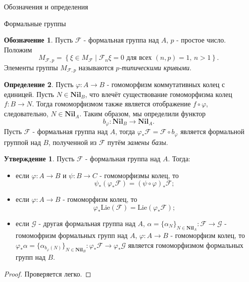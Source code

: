 \documentclass[a4paper,14pt]{extarticle}
\theoremstyle{definition}
\newtheorem{definition}{Определение}[section]
\newtheorem{denotation}[definition]{Обозначение}
\newtheorem{claim}[theorem]{Утверждение}
\newcommand{\Lie}[1]{\mathrm{Lie}\left(#1\right)}
\newcommand{\Nil}[1]{\mathbf{Nil}_{#1}}
\newcommand{\eF}{\mathcal{F}}
\newcommand{\sF}{\mathscr{F}}
\newcommand{\sG}{\mathscr{G}}
\begin{document}
\begin{section}{Обозначения и определения}
\begin{subsection}{Формальные группы}
\begin{denotation}\label{denote:3.8:p-typical_curves_group}
    Пусть $\sF$ - формальная группа над $A$, $p$ - простое число. Положим
    \begin{equation*}
        M_{\sF, p} = \left\{
            \xi \in M_\sF
        \middle|
            \text{${ \eF_n \xi = 0 }$ для всех ${ (n, p) = 1 }$, ${ n > 1 }$}
        \right\}.
    \end{equation*}
    Элементы группы $M_{\sF, p}$ называются \textit{$p$-типическими кривыми}.
\end{denotation}

\begin{definition}\label{def:3.3:base_change}
    Пусть ${ \varphi : A \rightarrow B }$ - гомоморфизм коммутативных колец с единицей. Пусть ${ N \in \Nil{B} }$, что влечёт существование гомоморфизма колец ${ f : B \rightarrow N }$. Тогда гомоморфизмом также является отображение ${ f \circ \varphi }$, следовательно, ${ N \in \Nil{A} }$. Таким образом, мы определили функтор
    \begin{equation*}
        b_\varphi : \Nil{B} \rightarrow \Nil{A}.
    \end{equation*}
    Пусть $\sF$ - формальная группа над $A$, тогда ${ \varphi_* \sF = \sF \circ b_\varphi }$ является формальной группой над $B$, полученной из $\sF$ путём \textit{замены базы}.
\end{definition}

\begin{claim}
    Пусть $\sF$ - формальная группа над $A$. Тогда:
    \begin{itemize}
        \item если ${ \varphi : A \rightarrow B }$ и ${ \psi : B \rightarrow C }$ - гомоморфизмы колец, то
        \begin{equation*}
            \psi_* \left( \varphi_* \sF \right) =
            (\psi \circ \varphi)_* \sF;
        \end{equation*}
        \item если ${ \varphi : A \rightarrow B }$ - гомоморфизм колец, то
        \begin{equation*}
            \varphi_* \Lie{\sF} =
            \Lie{\varphi_* \sF};
        \end{equation*}
        \item если $\sG$ - другая формальная группа над $A$, ${ \alpha = \{ \alpha_N \}_{N \in \Nil{A}} : \sF \rightarrow \sG }$ - гомомофризм формальных групп над $A$, ${ \varphi : A \rightarrow B }$ - гомоморфизм колец, то ${ \varphi_* \alpha = \{ \alpha_{b_\varphi(N)} \}_{N \in \Nil{B}} : \varphi_* \sF \rightarrow \varphi_* \sG }$ является гомоморфизмом формальных групп над $B$.
    \end{itemize}
\end{claim}
\begin{proof}
    Проверяется легко.
\end{proof}


\end{subsection}
\end{section}
\end{document}
